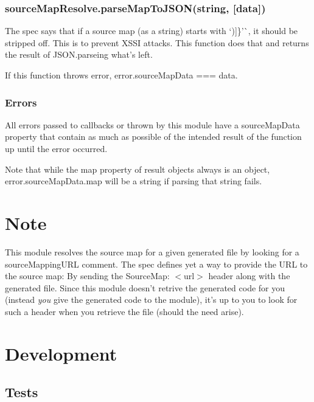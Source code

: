 \subsubsection*{{\ttfamily source\+Map\+Resolve.\+parse\+Map\+To\+J\+S\+O\+N(string, \mbox{[}data\mbox{]})}}

The spec says that if a source map (as a string) starts with `)\mbox{]}\}'\`{}, it should be stripped off. This is to prevent X\+S\+SI attacks. This function does that and returns the result of {\ttfamily J\+S\+O\+N.\+parse}ing what’s left.

If this function throws {\ttfamily error}, {\ttfamily error.\+source\+Map\+Data === data}.

\subsubsection*{Errors}

All errors passed to callbacks or thrown by this module have a {\ttfamily source\+Map\+Data} property that contain as much as possible of the intended result of the function up until the error occurred.

Note that while the {\ttfamily map} property of result objects always is an object, {\ttfamily error.\+source\+Map\+Data.\+map} will be a string if parsing that string fails.

\section*{Note }

This module resolves the source map for a given generated file by looking for a source\+Mapping\+U\+RL comment. The spec defines yet a way to provide the U\+RL to the source map\+: By sending the {\ttfamily Source\+Map\+: $<$url$>$} header along with the generated file. Since this module doesn’t retrive the generated code for you (instead {\itshape you} give the generated code to the module), it’s up to you to look for such a header when you retrieve the file (should the need arise).

\section*{Development }

\subsection*{Tests }

